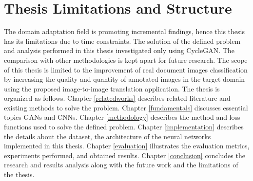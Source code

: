 \section{Thesis Limitations and Structure}\label{thesisstructurelimitations}
The domain adaptation field is promoting incremental findings, hence this thesis has its limitations due to time constraints. The solution of the defined problem and analysis performed in this thesis investigated only using \ac{CycleGAN}. The comparison with other methodologies is kept apart for future research. The scope of this thesis is limited to the improvement of real document images classification by increasing the quality and quantity of annotated images in the target domain using the proposed image-to-image translation application. The thesis is organized as follows. Chapter \ref{relatedworks} describes related literature and existing methods to solve the problem. Chapter \ref{fundamentals} discusses essential topics \acp{GAN} and \acp{CNN}. Chapter \ref{methodology} describes the method and loss functions used to solve the defined problem. Chapter \ref{implementation} describes the details about the dataset, the architecture of the neural networks implemented in this thesis. Chapter \ref{evaluation} illustrates the evaluation metrics, experiments performed, and obtained results. Chapter \ref{conclusion} concludes the research and results analysis along with the future work and the limitations of the thesis.

